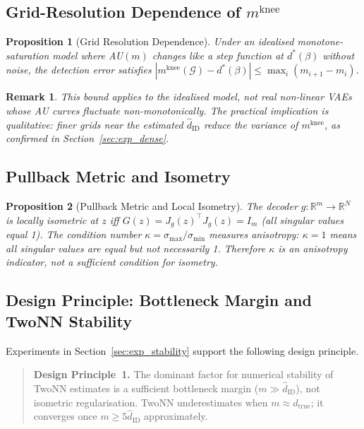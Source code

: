 \documentclass[11pt,a4paper]{article}
\newtheorem{proposition}{Proposition}
\newtheorem{remark}{Remark}
\newcommand{\Jg}{J_g}
\newcommand{\R}{\mathbb{R}}
\newcommand{\kap}{\kappa}
\newcommand{\mknee}{m^{\mathrm{knee}}}
\newcommand{\hatdID}{\hat{d}_{\mathrm{ID}}}
\begin{document}
\subsection{Grid-Resolution Dependence of $\mknee$}\label{sec:theory_grid}

\begin{proposition}[Grid Resolution Dependence]\label{thm:mknee_instab}
Under an idealised monotone-saturation model where AU$(m)$ changes like a step
function at $d^*(\beta)$ without noise, the detection error satisfies
$|\mknee(\mathcal{G})-d^*(\beta)|\leq\max_i(m_{i+1}-m_i)$.
\end{proposition}

\begin{remark}
This bound applies to the idealised model, not real non-linear VAEs whose AU
curves fluctuate non-monotonically.
The practical implication is qualitative: \emph{finer grids near the estimated
$\hatdID$ reduce the variance of $\mknee$}, as confirmed in Section~\ref{sec:exp_dense}.
\end{remark}

\subsection{Pullback Metric and Isometry}\label{sec:theory_pullback}

\begin{proposition}[Pullback Metric and Local Isometry]\label{thm:pullback}
The decoder $g:\R^m\!\to\R^N$ is locally isometric at $z$ iff
$G(z)=\Jg(z)^\top\Jg(z)=I_m$ (all singular values equal 1).
The condition number $\kap=\sigma_{\max}/\sigma_{\min}$ measures anisotropy:
$\kap=1$ means all singular values are \emph{equal} but not necessarily 1.
Therefore $\kap$ is an anisotropy indicator, not a sufficient condition for isometry.
\end{proposition}

\subsection{Design Principle: Bottleneck Margin and TwoNN Stability}
\label{sec:theory_dp}

Experiments in Section~\ref{sec:exp_stability} support the following design principle.

\begin{quote}
\textbf{Design Principle~1.}
The dominant factor for numerical stability of TwoNN estimates is a sufficient
bottleneck margin ($m\gg\hatdID$), not isometric regularisation.
TwoNN underestimates when $m\approx d_{\mathrm{true}}$; it converges once
$m\geq5\hatdID$ approximately.
\end{quote}
\end{document}
